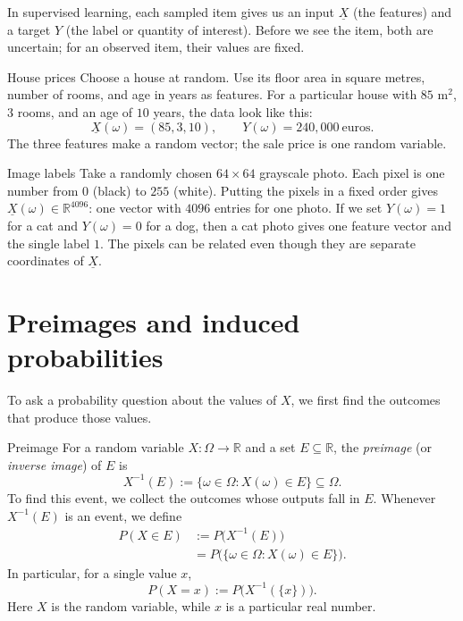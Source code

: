\documentclass[a4paper,12pt,oneside]{report}
\begin{document}
In supervised learning, each sampled item gives us an input $\underline{X}$
(the features) and a target $Y$ (the label or quantity of interest).
Before we see the item, both are uncertain; for an observed item, their
values are fixed.

\begin{framedexample}{House prices}
Choose a house at random. Use its floor area in square metres, number of
rooms, and age in years as features. For a particular house with $85$ m$^2$,
$3$ rooms, and an age of $10$ years, the data look like this:
\[
  \underline{X}(\omega)=(85,3,10),
  \qquad Y(\omega)=240{,}000\ \text{euros}.
\]
The three features make a random vector; the sale price is one random
variable.
\end{framedexample}

\begin{framedexample}{Image labels}
Take a randomly chosen $64\times64$ grayscale photo. Each pixel is one
number from $0$ (black) to $255$ (white). Putting the pixels in a fixed
order gives $\underline{X}(\omega)\in\mathbb R^{4096}$: one vector with
$4096$ entries for one photo. If we set $Y(\omega)=1$ for a cat and
$Y(\omega)=0$ for a dog, then a cat photo gives one feature vector and
the single label $1$. The pixels can be related even though they are
separate coordinates of $\underline{X}$.
\end{framedexample}

\clearpage
\section{Preimages and induced probabilities}

To ask a probability question about the values of $X$, we first find
the outcomes that produce those values.

\begin{frameddefn}{Preimage}\label{def:preimage}
For a random variable $X:\Omega\to\mathbb R$ and a set
$E\subseteq\mathbb R$, the \emph{preimage} (or \emph{inverse image}) of
$E$ is
\[
  X^{-1}(E):=\{\omega\in\Omega:X(\omega)\in E\}\subseteq\Omega.
\]
To find this event, we collect the outcomes whose outputs fall in $E$.
Whenever $X^{-1}(E)$ is an event, we define
\[
  \begin{aligned}
    P(X\in E)&:=P\bigl(X^{-1}(E)\bigr)\\
              &=P\bigl(\{\omega\in\Omega:X(\omega)\in E\}\bigr).
  \end{aligned}
\]
In particular, for a single value $x$,
\[
  P(X=x):=P\bigl(X^{-1}(\{x\})\bigr).
\]
Here $X$ is the random variable, while $x$ is a particular real number.
\end{frameddefn}
\end{document}
